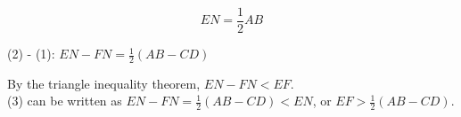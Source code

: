 \documentclass{article}
\begin{document}
\[
E N=\frac{1}{2} A B
\]

(2) - (1): \(E N-F N=\frac{1}{2}(A B-C D)\)

By the triangle inequality theorem, \(E N-F N<E F\).\\
(3) can be written as \(E N-F N=\frac{1}{2}(A B-C D)<E N\), or \(E F>\frac{1}{2}(A B-C D)\).
\end{document}
